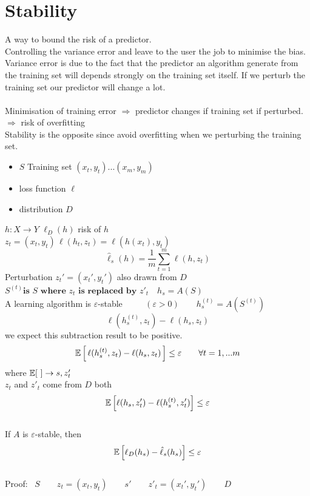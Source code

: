 \documentclass[../main.tex]{subfiles}
\begin{document}
\section{Stability}
A way to bound the risk of a predictor. \\ Controlling the variance error and leave to the user the job to minimise the bias.
\\ Variance error is due to the fact that the predictor an algorithm generate from the training set will depends strongly on the training set itself.
If we perturb the training set our predictor will change a lot.
\\\\
Minimisation of training error $ \Rightarrow $ predictor changes if training set if perturbed. $\Rightarrow $ risk of overfitting 
\\
Stability is the opposite since avoid overfitting when we perturbing the training set.
\\
\begin{itemize}
\item $S$ Training set $(x_t,y_t)...(x_m, y_m)$
\item loss function $\ell$ 
\item distribution $D$
\end{itemize}
$h: X \rightarrow Y$ $\ell_D(h)$ risk of $h$\\
$z_t = (x_t,y_t) \, \ell(h_t, z_t) = \ell(h(x_t),y_t)$
$$
\hat{\ell}_s(h) = \frac{1}{m} \sum_{t=1}^m \ell(h,z_t)
$$
Perturbation $z_t' = (x_t', y_t') $ also drawn from $D$
\\
$
S^{(t)} \textbf{is $S$ where $z_t$ is replaced by $z'_t$  }
$
$h_s= A(S)$
\\
A learning algorithm is $\varepsilon$-stable $\qquad$ $(\varepsilon > 0) \qquad h_s^{(t)} = A(S^{(t)})$
$$
\ell(h_s^{(t)}, z_t) - \ell(h_s, z_t)
$$
we expect this subtraction result to be positive.
$$
\mathbb{E} \left[ \,\ell(h_s^{(t)}, z_t) - \ell(h_s, z_t) \, \right] \leq \varepsilon \qquad \forall t = 1, ...m 
$$
where $\mathbb{E}[ \ ] \rightarrow s,z_t'$
\\
$z_t$ and $z'_t$ come from $D$ both
\\
$$
\mathbb{E} \left[ \ell(h_s,z'_t) - \ell(h_s^{(t)}, z_t' ) \right] \leq \varepsilon
$$
\\
If $A$ is $\varepsilon$-stable, then $$ 
\mathbb{E} \left[ \ell_D(h_s) - \hat{\ell}_s(h_s) \right] \leq \varepsilon
$$
\\
Proof: \ $S \qquad z_t = (x_t, y_t) \qquad s' \qquad z'_t = (x_t',y_t') \qquad D$
\end{document}
